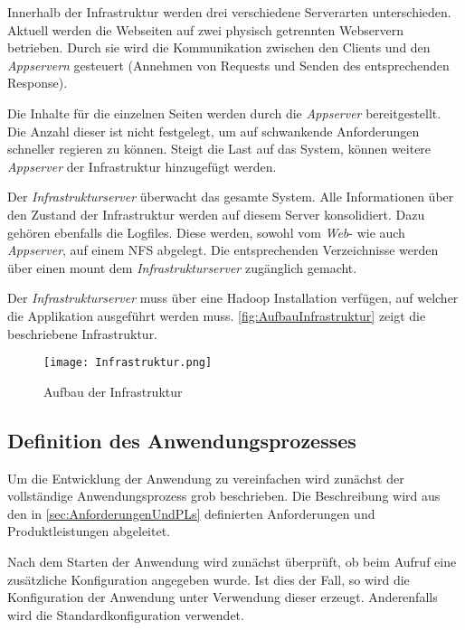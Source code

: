 Innerhalb der Infrastruktur werden drei verschiedene Serverarten unterschieden. Aktuell werden die Webseiten auf zwei physisch getrennten Webservern betrieben. Durch sie wird die Kommunikation zwischen den Clients und den \textit{Appservern} gesteuert (Annehmen von Requests und Senden des entsprechenden Response).

Die Inhalte für die einzelnen Seiten werden durch die \textit{Appserver} bereitgestellt. Die Anzahl dieser ist nicht festgelegt, um auf schwankende Anforderungen schneller regieren zu können. Steigt die Last auf das System, können weitere \textit{Appserver} der Infrastruktur hinzugefügt werden.

Der \textit{Infrastrukturserver} überwacht das gesamte System. Alle Informationen über den Zustand der Infrastruktur werden auf diesem Server konsolidiert. Dazu gehören ebenfalls die Logfiles. Diese werden, sowohl vom \textit{Web}- wie auch \textit{Appserver}, auf einem \ac{NFS} abgelegt. Die entsprechenden Verzeichnisse werden über einen mount dem \textit{Infrastrukturserver} zugänglich gemacht. 

Der \textit{Infrastrukturserver} muss über eine Hadoop Installation verfügen, auf welcher die Applikation ausgeführt werden muss. \autoref{fig:AufbauInfrastruktur} zeigt die beschriebene Infrastruktur. \\

\begin{figure}[h]
	\centering
	\texttt{[image: Infrastruktur.png]}
	\caption{Aufbau der Infrastruktur}
	\label{fig:AufbauInfrastruktur}
\end{figure}

\subsection{Definition des Anwendungsprozesses}
Um die Entwicklung der Anwendung zu vereinfachen wird zunächst der vollständige Anwendungsprozess grob beschrieben. Die Beschreibung wird aus den in \autoref{sec:AnforderungenUndPLs} definierten Anforderungen und Produktleistungen abgeleitet.


Nach dem Starten der Anwendung wird zunächst überprüft, ob beim Aufruf eine zusätzliche Konfiguration angegeben wurde. Ist dies der Fall, so wird die Konfiguration der Anwendung unter Verwendung dieser erzeugt. Anderenfalls wird die Standardkonfiguration verwendet.


